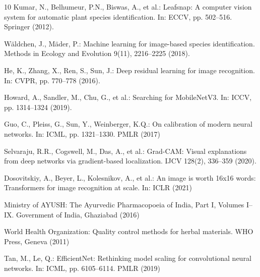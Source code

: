 \documentclass[sn-mathphys,Numbered]{sn-jnl}%
\begin{document}
\begin{thebibliography}{10}
Kumar, N., Belhumeur, P.N., Biswas, A., et al.: Leafsnap: A computer vision system for automatic plant species identification. In: ECCV, pp. 502--516. Springer (2012). 

W{\"a}ldchen, J., M{\"a}der, P.: Machine learning for image-based species identification. Methods in Ecology and Evolution 9(11), 2216--2225 (2018). 

He, K., Zhang, X., Ren, S., Sun, J.: Deep residual learning for image recognition. In: CVPR, pp. 770--778 (2016). 

Howard, A., Sandler, M., Chu, G., et al.: Searching for MobileNetV3. In: ICCV, pp. 1314--1324 (2019). 

Guo, C., Pleiss, G., Sun, Y., Weinberger, K.Q.: On calibration of modern neural networks. In: ICML, pp. 1321--1330. PMLR (2017)

Selvaraju, R.R., Cogswell, M., Das, A., et al.: Grad-CAM: Visual explanations from deep networks via gradient-based localization. IJCV 128(2), 336--359 (2020). 

Dosovitskiy, A., Beyer, L., Kolesnikov, A., et al.: An image is worth 16x16 words: Transformers for image recognition at scale. In: ICLR (2021)

Ministry of AYUSH: The Ayurvedic Pharmacopoeia of India, Part I, Volumes I--IX. Government of India, Ghaziabad (2016)

World Health Organization: Quality control methods for herbal materials. WHO Press, Geneva (2011)

Tan, M., Le, Q.: EfficientNet: Rethinking model scaling for convolutional neural networks. In: ICML, pp. 6105--6114. PMLR (2019)
\end{thebibliography}
\end{document}
